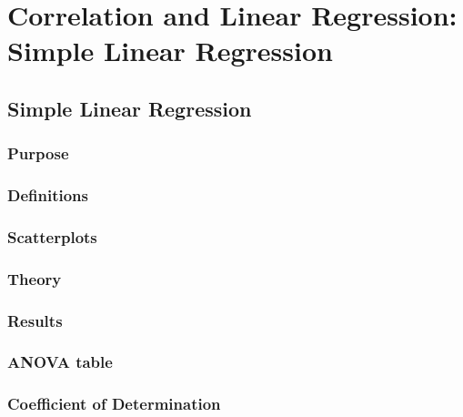 \chapter{Correlation and Linear Regression: Simple Linear Regression}  %

\section{Simple Linear Regression}  %
\subsection{Purpose}  %
\subsection{Definitions}  %
\subsection{Scatterplots}  %
\subsection{Theory}  %
\subsection{Results}  %
\subsection{ANOVA table}  %
\subsection{Coefficient of Determination}  %
